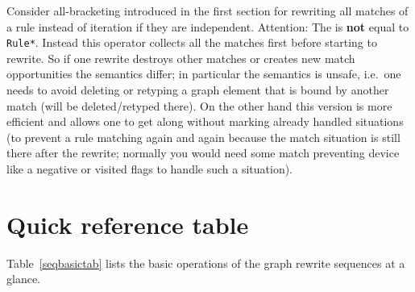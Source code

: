 \begin{note}
Consider all-bracketing introduced in the first section for rewriting all matches of a rule instead of iteration if they are independent.
Attention: The  is \textbf{not} equal to \texttt{Rule*}.
Instead this operator collects all the matches first before starting to rewrite.
So if one rewrite destroys other matches or creates new match opportunities the semantics differ;
in particular the semantics is unsafe, i.e.\ one needs to avoid deleting or retyping a graph element that is bound by another match (will be deleted/retyped there). On the other hand this version is more efficient and allows one to get along without marking already handled situations (to prevent a rule matching again and again because the match situation is still there after the rewrite; normally you would need some match preventing device like a negative or visited flags to handle such a situation).
\end{note}

\pagebreak

\section{Quick reference table}

Table~\ref{seqbasictab} lists the basic operations of the graph rewrite sequences at a glance.

